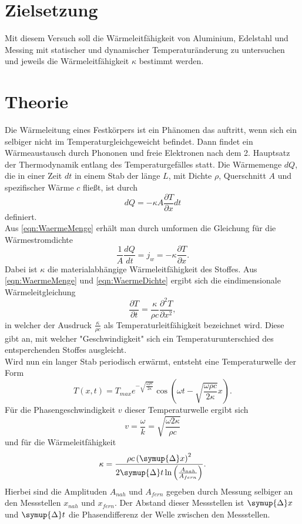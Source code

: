 \section{Zielsetzung}
\label{sec:Zielsetzung}
Mit diesem Versuch soll die Wärmeleitfähigkeit von Aluminium, Edelstahl und Messing
mit statischer und dynamischer Temperaturänderung zu untersuchen und jeweils die Wärmeleitfähigkeit $\kappa$ bestimmt werden.
\section{Theorie}
\label{sec:Theorie}
Die Wärmeleitung eines Festkörpers ist ein Phänomen das auftritt, wenn sich ein selbiger nicht im Temperaturgleichgeweicht
befindet. Dann findet ein Wärmeaustausch durch Phononen und freie Elektronen nach dem 2. Hauptsatz der Thermodynamik entlang des Temperaturgefälles statt.
Die Wärmemenge $dQ$, die in einer Zeit $dt$ in einem Stab der länge $L$, mit Dichte $\rho$, Querschnitt $A$ und spezifischer Wärme $c$ fließt, ist durch
\begin{equation}
    \label{eqn:WaermeMenge}
    dQ = -\kappa A\frac{\partial T}{\partial x}dt
\end{equation}
definiert.\\
Aus \eqref{eqn:WaermeMenge} erhält man durch umformen die Gleichung für die Wärmestromdichte
\begin{equation}
    \label{eqn:WaermeDichte}
    \frac{1}{A}\frac{dQ}{dt} = j_w = -\kappa \frac{\partial T}{\partial x}.
\end{equation}
Dabei ist $\kappa$ die materialabhängige Wärmeleitfähigkeit des Stoffes.
Aus \eqref{eqn:WaermeMenge} und \eqref{eqn:WaermeDichte} ergibt sich die eindimensionale Wärmeleitgleichung
\begin{equation}
    \frac{\partial T}{\partial t} = \frac{\kappa}{\rho c}\frac{\partial^2 T}{\partial x^2},
\end{equation}
in welcher der Ausdruck $\frac{\kappa}{\rho c}$ als Temperaturleitfähigkeit bezeichnet wird. Diese gibt an,
mit welcher "Geschwindigkeit" sich ein Temperaturunterschied des entsperchenden Stoffes ausgleicht.
\\
Wird nun ein langer Stab periodisch erwärmt, entsteht eine Temperaturwelle der Form
\begin{equation}
    T\left(x,t\right) = T_{max}e^{-\sqrt{\frac{\omega \rho c}{2\kappa}}}\cos\left(\omega t - \sqrt{\frac{\omega \rho c}{2\kappa}}x\right).
\end{equation}
Für die Phasengeschwindigkeit $v$ dieser Temperaturwelle ergibt sich
\begin{equation}
    v = \frac{\omega}{k} = \sqrt{\frac{\omega 2 \kappa}{\rho c}}
\end{equation}
und für die Wärmeleitfähigkeit
\begin{equation}
    \label{eqn:kappa}
    \kappa = \frac{\rho c \left(\symup{\Delta}x\right)^2}{2\symup{\Delta}t\ln\left(\frac{A_{nah}}{A_{fern}}\right)}.
\end{equation}
Hierbei sind die Amplituden $A_{nah}$ und $A_{fern}$ gegeben durch Messung selbiger an den Messstellen $x_{nah}$ und $x_{fern}$.
Der Abstand dieser Messstellen ist $\symup{\Delta}x$ und $\symup{\Delta}t$ die Phasendifferenz der Welle zwischen den Messstellen.